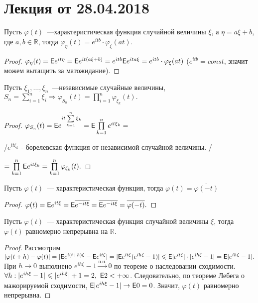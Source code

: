 \section{Лекция от 28.04.2018}

	\begin{property}
		Пусть $\varphi(t)$~---характеристическая функция случайной величины $\xi$, а $\eta = a\xi + b$, где $a, b \in \mathbb{R}$, тогда $\varphi_\eta(t) = e^{itb}\cdot \varphi_\xi(at).$
		\begin{proof}
			$\varphi_\eta(t) = \mathsf{E} e^{it\eta} = \mathsf{E} e^{it(a\xi + b)} = e^{itb} \mathsf{E} e^{ita\xi} = e^{itb}\cdot \varphi_\xi(at)$ ($e^{itb} = const$, значит можем вытащить за матожидание).
		\end{proof}
	\end{property}

	\begin{property}
		Пусть $\xi_1, \ldots, \xi_n$~---независимые случайные величины, $S_n = \sum\limits_{i = 1}^{n}\xi_i \Rightarrow \varphi_{S_n}(t) = \prod\limits_{i = 1}^n\varphi_{\xi_k}(t).$  
		\begin{proof}
			$\varphi_{S_n}(t) = \mathsf{E} e^{it \sum\limits_{k = 1}^{n}\xi_k} = \mathsf{E}\prod\limits_{k = 1}^n e^{it\xi_k} =$ 
			
			/$e^{it\xi_k}$ - борелевская функция от независимой случайной величины. / 
			
			$= \prod\limits_{k = 1}^{n}\mathsf{E} e^{it\xi_k} = \prod\limits_{k = 1}^{n}\varphi_{\xi_k}(t).$
		\end{proof}
	\end{property}
	\begin{property}
		Пусть $\varphi(t)$~--- характеристическая функция, тогда $\varphi(t) = \overline{\varphi(-t)}$
		\begin{proof}
			$\varphi(t) = \mathsf{E} e^{it\xi} = \mathsf{E}\overline{e^{-it\xi}} = \overline{\mathsf{E} e^{-it\xi}} = \overline{\varphi(-t)}.$
		\end{proof}
	\end{property}
	\begin{property}
		Пусть $\varphi(t)$~--- характеристическая функция случайной величины $\xi$, тогда $\varphi(t)$ равномерно непрерывна на $\mathbb{R}.$
		\begin{proof}
			Рассмотрим $|\varphi(t + h) - \varphi(t)| = |\mathsf{E} e^{i(t+h)\xi} - \mathsf{E} e^{it\xi}| = |\mathsf{E} e^{it\xi}(e^{ih\xi} - 1)| \leqslant \mathsf{E} |e^{it\xi}|\cdot |e^{ih\xi} - 1| = \mathsf{E} |e^{ih\xi} - 1|.$
			При $h \to 0$ выполнено $e^{ih\xi} - 1 \overset{\text{п.н.}} \longrightarrow 0 $ по теореме о наследовании сходимости. $\forall h: |e^{ih\xi} - 1| \leqslant |e^{ih\xi}| + 1 = 2, ~ \mathsf{E} 2 < +\infty$. Следовательно, по теореме Лебега о мажорируемой сходимости, $\mathsf{E} |e^{ih\xi} - 1| \to \mathsf{E} 0 = 0$. Значит, $\varphi(t)$ равномерно непрерывна.
		\end{proof}
	\end{property}
